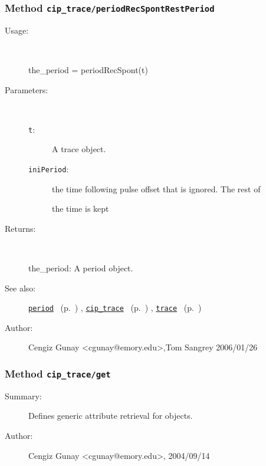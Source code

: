 \subsubsection[Method \texttt{periodRecSpontRestPeriod}]{Method \texttt{cip\_trace/periodRecSpontRestPeriod}}%
%
\label{ref_cip_trace__periodRecSpontRestPeriod}%
\hypertarget{ref_cip_trace__periodRecSpontRestPeriod}{}%
\begin{description}
%
\item[Usage:]~%
\begin{lyxcode}%
the\_period = periodRecSpont(t)
%
\end{lyxcode}%
%
%
\item[Parameters:]~
\begin{description}%
\item[\texttt{t}:]
 A trace object.
\item[\texttt{iniPeriod}:]
 the time following pulse offset that is ignored. The rest of

the time is kept\end{description}%
%
\item[Returns:]~

	the\_period: A period object.
%
%
\item[See also:]%
\hyperlink{ref_period}{\texttt{period}}%
\ (p.~\pageref{ref_period})%
%
, \hyperlink{ref_cip_trace}{\texttt{cip\_trace}}%
\ (p.~\pageref{ref_cip_trace})%
%
, \hyperlink{ref_trace}{\texttt{trace}}%
\ (p.~\pageref{ref_trace})%
%
%
\item[Author:]%
Cengiz Gunay <cgunay@emory.edu>,Tom Sangrey 2006/01/26%
\end{description}
\methodline%
\subsubsection[Method \texttt{get}]{Method \texttt{cip\_trace/get}}%
%
\label{ref_cip_trace__get}%
\hypertarget{ref_cip_trace__get}{}%
\begin{description}
\item[Summary:]Defines generic attribute retrieval for objects.
%
%
%
%
%
%
%
\item[Author:]%
Cengiz Gunay <cgunay@emory.edu>, 2004/09/14%
\end{description}
\methodline%
